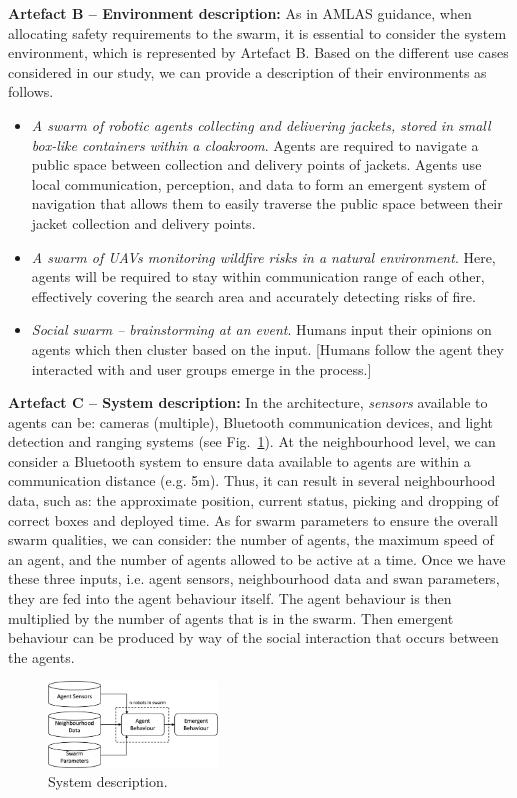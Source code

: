\documentclass[lettersize,journal]{IEEEtran}
\begin{document}
\noindent \textbf{Artefact B -- Environment description: }
As in AMLAS guidance, when allocating safety requirements to the swarm, it is essential to consider the system environment, which is represented by Artefact B. 
Based on the different use cases considered in our study, we can provide a description of their environments as follows.
\begin{itemize}
	\item \textit{A swarm of robotic agents collecting and delivering jackets, stored in small box-like containers within a cloakroom}. Agents are required to navigate a public space between collection and delivery points of jackets. Agents use local communication, perception, and data to form an emergent system of navigation that allows them to easily traverse the public space between their jacket collection and delivery points.
	\item \textit{A swarm of UAVs monitoring wildfire risks in a natural environment}. Here, agents will be required to stay within communication range of each other, effectively covering the search area and accurately detecting risks of fire.
	\item \textit{Social swarm – brainstorming at an event}. Humans input their opinions on agents which then cluster based on the input. [Humans follow the agent they interacted with and user groups emerge in the process.]\\
\end{itemize}

\noindent \textbf{Artefact C -- System description: }
In the architecture, \textit{sensors} available to agents can be: cameras (multiple), Bluetooth communication devices, and light detection and ranging systems (see Fig.~\ref{system-description}). 
At the neighbourhood level, we can consider a Bluetooth system to ensure data available to agents are within a communication distance (e.g. 5m). 
Thus, it can result in several neighbourhood data, such as: the approximate position, current status, picking and dropping of correct boxes and deployed time. 
As for swarm parameters to ensure the overall swarm qualities, we can consider: the number of agents, the maximum speed of an agent, and the number of agents allowed to be active at a time. 
Once we have these three inputs, i.e. agent sensors, neighbourhood data and swan parameters, they are fed into the agent behaviour itself.
The agent behaviour is then multiplied by the number of agents that is in the swarm. 
Then emergent behaviour can be produced by way of the social interaction that occurs between the agents.\\
\begin{figure}
	\centering
	\includegraphics[width=0.4\textwidth]{figures/stage1-systema.png}
	\caption{System description.}
	\label{system-description}
\end{figure}
\end{document}
